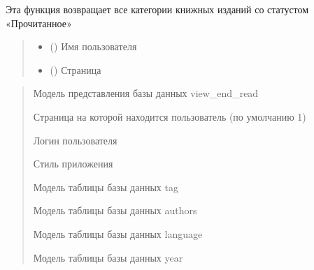 \documentclass[letterpaper,10pt,russian]{sphinxmanual}
\begin{document}
\begin{fulllineitems}
\label{\detokenize{blueprints:blueprints.select_books_state.end_read}}
\pysigstartsignatures
{}
\pysigstopsignatures
\sphinxAtStartPar
Эта функция возвращает все категории книжных изданий со статустом «Прочитанное»
\begin{quote}\begin{description}
\begin{itemize}
\item {} 
\sphinxAtStartPar
{} () \textendash{} Имя пользователя

\item {} 
\sphinxAtStartPar
{} () \textendash{} Страница

\end{itemize}

\end{description}\end{quote}
\begin{description}
\begin{quote}\begin{description}
\sphinxAtStartPar
Модель представления базы данных view\_end\_read

\sphinxAtStartPar
Страница на которой находится пользователь (по умолчанию 1)

\sphinxAtStartPar
Логин пользователя

\sphinxAtStartPar
Стиль приложения

\sphinxAtStartPar
Модель таблицы базы данных tag

\sphinxAtStartPar
Модель таблицы базы данных authors

\sphinxAtStartPar
Модель таблицы базы данных language

\sphinxAtStartPar
Модель таблицы базы данных year


\end{description}
\end{quote}
\end{description}
\end{fulllineitems}
\end{document}
